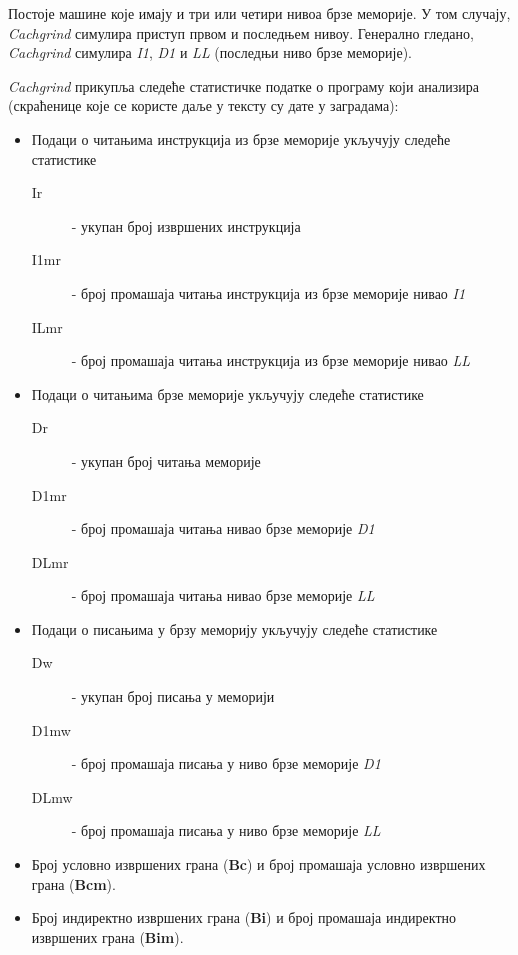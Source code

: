 \documentclass[12pt,oneside]{memoir}
\begin{document}
\indent Постоје машине које имају и три или четири нивоа брзе меморије. У том случају, \textit{Cachgrind} симулира приступ првом и последњем нивоу. Генерално гледано, \textit{Cachgrind} симулира  \textit{I1}, \textit{D1} и \textit{LL} (последњи ниво брзе меморије).

\indent \textit{Cachgrind} прикупља следеће статистичке податке о програму који анализира (скраћенице које се користе даље у тексту су дате у заградама):

\begin{itemize}
	\item  Подаци о читањима инструкција из брзе меморије укључују следеће статистике
\begin{description}
	\item[Ir] - укупан број извршених инструкција
	\item[I1mr] - број промашаја читања инструкција из брзе меморије нивао \textit{I1}
	\item[ILmr] - број промашаја читања инструкција из брзе меморије нивао \textit{LL}
\end{description}
	\item Подаци о читањима брзе меморије укључују следеће статистике
\begin{description}
	\item[Dr] - укупан број читања меморије
	\item[D1mr] - број промашаја читања нивао брзе меморије \textit{D1}
	\item[DLmr] - број промашаја читања нивао брзе меморије \textit{LL}
\end{description}
	\item Подаци о писањима у брзу меморију укључују следеће статистике
\begin{description}
	\item[Dw] - укупан број писања у меморији
	\item[D1mw] - број промашаја писања у ниво брзе меморије \textit{D1}
	\item[DLmw] - број промашаја писања у ниво брзе меморије \textit{LL}
\end{description}
	\item Број условно извршених грана (\textbf{Bc}) и број промашаја условно извршених грана (\textbf{Bcm}).
	\item Број индиректно извршених грана (\textbf{Bi}) и број промашаја индиректно извршених грана (\textbf{Bim}).
\end{itemize}
    
   
\end{document}
